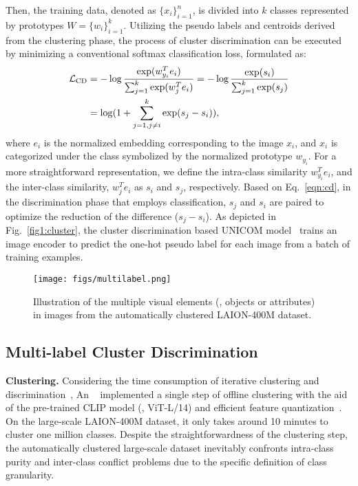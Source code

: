 Then, the training data, denoted as $\{x_i\}_{i=1}^n$, is divided into $k$ classes represented by prototypes $W=\{w_i\}_{i=1}^k$. 
Utilizing the pseudo labels and centroids derived from the clustering phase, the process of cluster discrimination can be executed by minimizing a conventional softmax classification loss, formulated as:
\vspace{-2mm}
\begin{align}
\label{eqn:cd}
 \mathcal{L}_\mathrm{CD} 
& = - \log \frac{\exp( w_{y_i}^T e_i)}{\sum_{j=1}^{k} \exp(w_j^Te_i)} 
   = - \log \frac{\exp({s_i})}{\sum_{j=1}^{k} \exp({s_j})} \notag \\ 
&  = \log (1 + \sum_{j=1, j \neq i}^{k} \exp(s_j-s_i)), 
\end{align}
where $e_i$ is the normalized embedding corresponding to the image $x_i$, and $x_i$ is categorized under the class symbolized by the normalized prototype $w_{y_i}$. For a more straightforward representation, we define the intra-class similarity $w_{y_i}^Te_i$, and the inter-class similarity, $w_j^Te_i$ as $s_i$ and $s_j$, respectively. 
Based on Eq.~\ref{eqn:cd}, in the discrimination phase that employs classification, $s_j$ and $s_i$ are paired to optimize the reduction of the difference ($s_j-s_i$). As depicted in Fig.~\ref{fig1:cluster}, the cluster discrimination based UNICOM model~\cite{an2023unicom} trains an image encoder to predict the one-hot pseudo label for each image from a batch of training examples.


\begin{figure}[!t]
\centering
\texttt{[image: figs/multilabel.png]}
\caption{Illustration of the multiple visual elements (\eg, objects or attributes) in images from the automatically clustered LAION-400M dataset.}
\label{fig:pruityconflict}
\vspace{-4mm}
\end{figure}

\subsection{Multi-label Cluster Discrimination} 

\noindent\textbf{Clustering.}
Considering the time consumption of iterative clustering and discrimination~\cite{caron2018deep}, An \etal~\cite{an2023unicom} implemented a single step of offline clustering with the aid of the pre-trained CLIP model (\ie, ViT-L/14) and efficient feature quantization~\cite{johnson2019billion}. On the large-scale LAION-400M dataset, it only takes around 10 minutes to cluster one million classes. Despite the straightforwardness of the clustering step, the automatically clustered large-scale dataset inevitably confronts intra-class purity and inter-class conflict problems due to the specific definition of class granularity.

